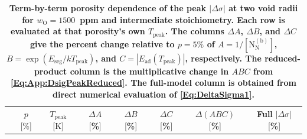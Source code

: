 \documentclass[preprint,12pt,sort&compress]{elsarticle}
\newcommand{\?}{\stackrel{?}{=}}
\providecommand{\DIFaddtex}[1]{{\bf #1}} %
\providecommand{\DIFdeltex}[1]{} %
\providecommand{\DIFaddend}{\protect\color{black}} %
\providecommand{\DIFaddFL}[1]{\DIFadd{#1}} %
\providecommand{\DIFdelFL}[1]{\DIFdel{#1}} %
\providecommand{\DIFaddbeginFL}{} %
\providecommand{\DIFaddendFL}{} %
\providecommand{\DIFdelbeginFL}{} %
\providecommand{\DIFdelendFL}{} %
\providecommand{\DIFadd}[1]{\texorpdfstring{\DIFaddtex{#1}}{#1}} %
\providecommand{\DIFdel}[1]{\texorpdfstring{\DIFdeltex{#1}}{}} %
\begin{document}

\DIFaddend \begin{table}[h!]
\centering
\DIFdelbeginFL %
\DIFdelFL{Porosity dependence of the peak $|\Delta \sigma|$ at two void radii ($w_\text{O} = 1500$~ppm, intermediate stoichiometry). Each row is evaluated at that porosity's own $T_\text{peak}$ from \cref{Eq:App:TstarFormula}.}%
\DIFdelendFL \DIFaddbeginFL \scriptsize
\caption{\DIFaddFL{Term-by-term porosity dependence of the peak $|\Delta\sigma|$ at two void radii for $w_\text{O}=1500$~ppm and intermediate stoichiometry. Each row is evaluated at that porosity's own $T_\text{peak}$. The columns $\Delta A$, $\Delta B$, and $\Delta C$ give the percent change relative to $p=5\%$ of $A=1/[\text{N}_\text{N}^{(\text{b})}]$, $B=\exp(E_\text{seg}/kT_\text{peak})$, and $C=|E_\text{ad}(T_\text{peak})|$, respectively. The reduced-product column is the multiplicative change in $ABC$ from \cref{Eq:App:DsigPeakReduced}. The full-model column is obtained from direct numerical evaluation of \cref{Eq:DeltaSigma1}.}}
\DIFaddendFL \label{Tab:App:por}
\DIFdelbeginFL %
\DIFdelendFL \DIFaddbeginFL \begin{tabular}{lccccccc}
\DIFaddendFL \hline
& $p$ [\%]
& $T_\text{peak}$ [K]
& \DIFdelbeginFL \DIFdelFL{$1/[\text{N}_\text{N}^{(\text{b})}]$ }\DIFdelendFL \DIFaddbeginFL \DIFaddFL{$\Delta A$ }[\DIFaddFL{\%}]
\DIFaddendFL & \DIFaddbeginFL \DIFaddFL{$\Delta B$ }[\DIFaddFL{\%}]
& \DIFaddFL{$\Delta C$ }[\DIFaddFL{\%}]
& \DIFaddFL{$\Delta(ABC)$ }[\DIFaddFL{\%}]
& \DIFaddFL{Full }\DIFaddendFL $|\Delta\sigma|$ \DIFdelbeginFL \DIFdelFL{variation }\DIFdelendFL \DIFaddbeginFL [\DIFaddFL{\%}] \DIFaddendFL \\

\end{tabular}
\end{table}
\end{document}
